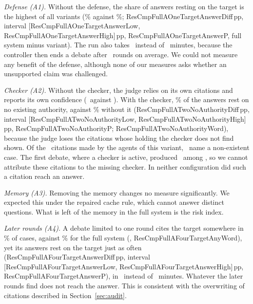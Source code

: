 \documentclass[conference]{IEEEtran}
\newcommand{\pp}{\,pp}
\newcommand{\cmp}[3]{\csname ResCmp#1#2Diff\endcsname#3, interval [\csname ResCmp#1#2Low\endcsname, \csname ResCmp#1#2High\endcsname]#3, \csname ResCmp#1#2P\endcsname}
\newcommand{\cmpword}[2]{\csname ResCmp#1#2Word\endcsname}
\begin{document}
\emph{Defense (A1).} Without the defense, the share of answers resting on the target is the highest of all variants (\ResPaAOneTargetAnswer\% against \ResPaFullTargetAnswer\%; \cmp{FullAOne}{TargetAnswer}{\pp}, full system minus variant). The run also takes \ResPaAOneMinutes\ instead of \ResPaFullMinutes\ minutes, because the controller then ends a debate after \ResPaAOneRounds\ rounds on average. We could not measure any benefit of the defense, although none of our measures asks whether an unsupported claim was challenged.

\emph{Checker (A2).} Without the checker, the judge relies on its own citations and reports its own confidence (\ResPaATwoConf\ against \ResPaFullConf). With the checker, \ResPaFullNoAuthority\% of the answers rest on no existing authority, against \ResPaATwoNoAuthority\% without it (\cmp{FullATwo}{NoAuthority}{\pp}; \cmpword{FullATwo}{NoAuthority}), because the judge loses the citations whose holding the checker does not find shown. Of the \ResPaATwoCitationsMade\ citations made by the agents of this variant, \ResPaATwoNotFound\ name a non-existent case. The first debate, where a checker is active, produced \ResPaOldNotFound\ among \ResPaOldCitationsMade, so we cannot attribute these citations to the missing checker. In neither configuration did such a citation reach an answer.

\emph{Memory (A3).} Removing the memory changes no measure significantly. We expected this under the repaired cache rule, which cannot answer distinct questions. What is left of the memory in the full system is the risk index.

\emph{Later rounds (A4).} A debate limited to one round cites the target somewhere in \ResPaAFourTargetAny\% of cases, against \ResPaFullTargetAny\% for the full system (\ResCmpFullAFourTargetAnyP, \cmpword{FullAFour}{TargetAny}), yet its answers rest on the target just as often (\cmp{FullAFour}{TargetAnswer}{\pp}), in \ResPaAFourMinutes\ instead of \ResPaFullMinutes\ minutes. Whatever the later rounds find does not reach the answer. This is consistent with the overwriting of citations described in Section~\ref{sec:audit}.
\end{document}
